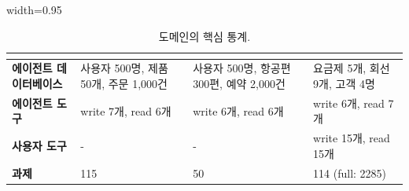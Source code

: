 \begin{table}[t]
    \centering
    \caption{\bench 도메인의 핵심 통계.}
    \label{tab:domains}
    \vspace{0.2em}
    \begin{adjustbox}{width=0.95\textwidth}
    \begin{tabular}{llll}
    \toprule
     & \textbf{\retail{}} & \textbf{\airline{}} & \textbf{\telecom{}} \\
    \midrule 
    \textbf{에이전트 데이터베이스} & 사용자 500명, 제품 50개, 주문 1,000건 & 사용자 500명, 항공편 300편, 예약 2,000건 & 요금제 5개, 회선 9개, 고객 4명 \\
    \textbf{에이전트 도구} & write 7개, read 6개 & write 6개, read 6개 & write 6개, read 7개 \\
    \textbf{사용자 도구} & - & - & write 15개, read 15개 \\
    \textbf{과제} & 115 & 50 & 114 (full: 2285)\\
    \bottomrule
    \end{tabular}
    \end{adjustbox}
\end{table}
